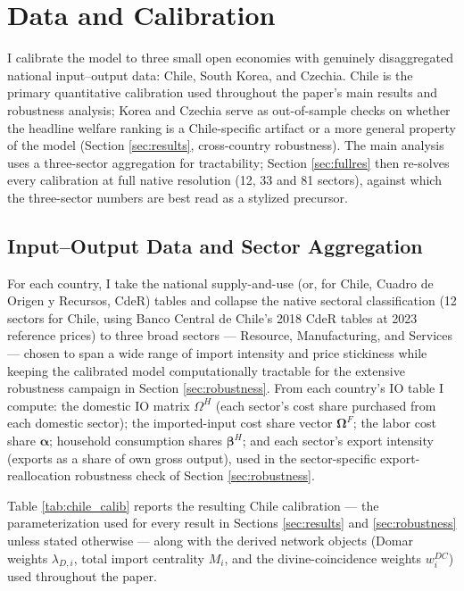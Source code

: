 \documentclass[12pt]{article}
\begin{document}
\section{Data and Calibration}
\label{sec:data}

I calibrate the model to three small open economies with genuinely disaggregated national
input--output data: Chile, South Korea, and Czechia. Chile is the primary quantitative calibration
used throughout the paper's main results and robustness analysis; Korea and Czechia serve as
out-of-sample checks on whether the headline welfare ranking is a Chile-specific artifact or a more
general property of the model (Section \ref{sec:results}, cross-country robustness). The main
analysis uses a three-sector aggregation for tractability; Section \ref{sec:fullres} then re-solves
every calibration at full native resolution (12, 33 and 81 sectors), against which the three-sector
numbers are best read as a stylized precursor.

\subsection{Input--Output Data and Sector Aggregation}

For each country, I take the national supply-and-use (or, for Chile, Cuadro de Origen y Recursos,
CdeR) tables and collapse the native sectoral classification (12 sectors for Chile, using Banco
Central de Chile's 2018 CdeR tables at 2023 reference prices) to three broad sectors --- Resource,
Manufacturing, and Services --- chosen to span a wide range of import intensity and price stickiness
while keeping the calibrated model computationally tractable for the extensive robustness campaign in
Section \ref{sec:robustness}. From each country's IO table I compute: the domestic IO matrix
$\Omega^H$ (each sector's cost share purchased from each domestic sector); the imported-input cost
share vector $\bm\Omega^F$; the labor cost share $\bm\alpha$; household consumption shares
$\bm\beta^H$; and each sector's export intensity (exports as a share of own gross output), used in
the sector-specific export-reallocation robustness check of Section \ref{sec:robustness}.

Table \ref{tab:chile_calib} reports the resulting Chile calibration --- the parameterization used for
every result in Sections \ref{sec:results} and \ref{sec:robustness} unless stated otherwise --- along
with the derived network objects (Domar weights $\lambda_{D,i}$, total import centrality $M_i$, and
the divine-coincidence weights $w_i^{DC}$) used throughout the paper.
\end{document}

